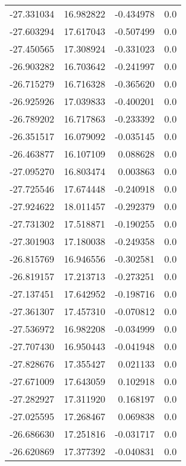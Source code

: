 \begin{tabular}{rrrr}
      -27.331034 &        16.982822 &   -0.434978 &   0.0 \\
      -27.603294 &        17.617043 &   -0.507499 &   0.0 \\
      -27.450565 &        17.308924 &   -0.331023 &   0.0 \\
      -26.903282 &        16.703642 &   -0.241997 &   0.0 \\
      -26.715279 &        16.716328 &   -0.365620 &   0.0 \\
      -26.925926 &        17.039833 &   -0.400201 &   0.0 \\
      -26.789202 &        16.717863 &   -0.233392 &   0.0 \\
      -26.351517 &        16.079092 &   -0.035145 &   0.0 \\
      -26.463877 &        16.107109 &    0.088628 &   0.0 \\
      -27.095270 &        16.803474 &    0.003863 &   0.0 \\
      -27.725546 &        17.674448 &   -0.240918 &   0.0 \\
      -27.924622 &        18.011457 &   -0.292379 &   0.0 \\
      -27.731302 &        17.518871 &   -0.190255 &   0.0 \\
      -27.301903 &        17.180038 &   -0.249358 &   0.0 \\
      -26.815769 &        16.946556 &   -0.302581 &   0.0 \\
      -26.819157 &        17.213713 &   -0.273251 &   0.0 \\
      -27.137451 &        17.642952 &   -0.198716 &   0.0 \\
      -27.361307 &        17.457310 &   -0.070812 &   0.0 \\
      -27.536972 &        16.982208 &   -0.034999 &   0.0 \\
      -27.707430 &        16.950443 &   -0.041948 &   0.0 \\
      -27.828676 &        17.355427 &    0.021133 &   0.0 \\
      -27.671009 &        17.643059 &    0.102918 &   0.0 \\
      -27.282927 &        17.311920 &    0.168197 &   0.0 \\
      -27.025595 &        17.268467 &    0.069838 &   0.0 \\
      -26.686630 &        17.251816 &   -0.031717 &   0.0 \\
      -26.620869 &        17.377392 &   -0.040831 &   0.0 \\

\end{tabular}
